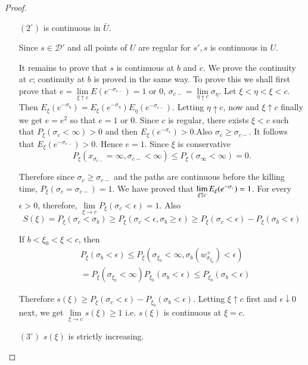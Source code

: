 \begin{proof}
\begin{itemize}
\item[$(2^{\circ})$]
is continuous in $\bar{U}$.

Since $s\in\mathscr{D'}$ and all points of $U$ are regular for $s', s$
is continuous in $U$.  

It remains to prove that $s$ is continuous at $b$ and $c$. We prove
the continuity at $c$; continuity at $b$ is proved in the same way. To
prove this we shall first prove that $e= \lim\limits_{\xi \uparrow c}
E (e^{-\sigma_{c-}})=1$ or $0$, $\sigma_{c-} = \lim\limits _{\eta
  \uparrow c} \sigma_\eta$. Let $\xi < \eta < \xi < c$. Then $E_\xi
(e^{-\sigma_\eta}) = E_\xi (e^{- \sigma_\eta}) E_\eta (e^{-
  \sigma_{c-}})$. 
Letting $\eta \uparrow c$, now and $\xi \uparrow c$ finally
we get $e=e^2$ so that $e=1$ or $0$. Since $c$ is regular, there exists
$\xi < c$ such that $P_\xi (\sigma_c < \infty) > 0$ and then $E_\xi
(e^{- \sigma_c})> 0$.\pageoriginale Also $\sigma _c \geq \sigma_{c-}$. It follows
that $E_\xi (e^{-\sigma_{c-}})>0$. 
Hence $e=1$. Since $\xi$ is conservative
$$
P_\xi (x_{\sigma_{c-}} = \infty , \sigma_{c-} < \infty ) \leq P_\xi
(\sigma_\infty < \infty) = 0. 
$$

Therefore since $\sigma_c \geq \sigma_{c-}$ and the paths are
continuous before the killing time, $P_\xi (\sigma _c =
\sigma_{c-})=1$. We have proved that $\lim\limits_{\xi \uparrow c}
E_\xi (e^{- \sigma_c})\break =1$. For every $\epsilon > 0$, therefore,
$\lim\limits_{\xi \to c} P_\xi (\sigma_c < \epsilon)=1$. Also 
{\fontsize{10pt}{12pt}\selectfont
$$
S(\xi) = P_\xi (\sigma _c < \sigma _b) \geq P_\xi (\sigma _c < \epsilon,
\sigma _b \geq\epsilon) \geq P_\xi (\sigma _c < \epsilon) - P_\xi (\sigma_b <
\epsilon) 
$$}\relax


If $b< \xi_0 < \xi < c$, then
\begin{align*}
& P_\xi (\sigma_b < \epsilon) \leq P_\xi (\sigma_{\xi_{0}} < \infty, \sigma_b
(w^+_{\sigma_{\xi_0}})< \epsilon)\\
& = P_{\xi} (\sigma_{\xi_{0}} < \infty)P_{\xi_0}
(\sigma_b < \epsilon)\leq P_{\xi_{0}}(\sigma_{b}<\epsilon) 
\end{align*}

Therefore $s(\xi)\geq P_\xi (\sigma_c < \epsilon) - P_{\xi_0} (\sigma_b <
\epsilon)$. Letting $\xi \uparrow c$ first and $\epsilon\downarrow 0$ 
next, we get $\lim\limits_{\xi \to c} s (\xi) \geq 1$ i.e. $s(\xi)$ is
continuous at $\xi = c$. 

\item[$(3^{\circ})$]
$s(\xi)$ is strictly increasing.


\end{itemize}
\end{proof}
